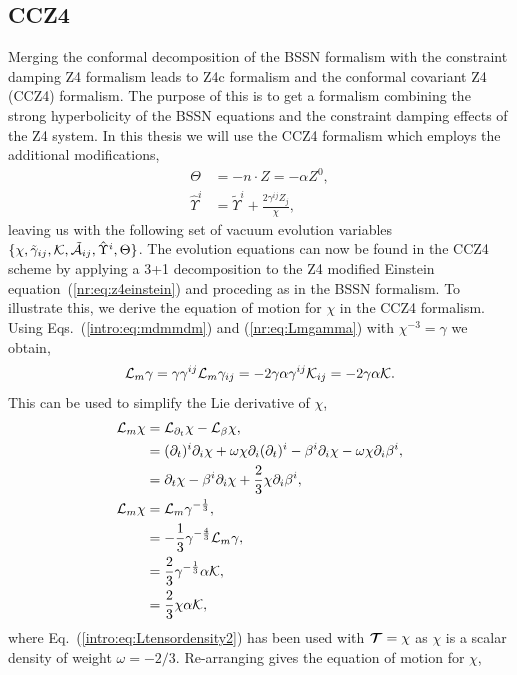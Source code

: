 \subsection{CCZ4} \label{nr:sec:ccz4}
Merging the conformal decomposition of the BSSN formalism with the constraint damping Z4 formalism leads to
Z4c formalism \cite{Bernuzzi:2009ex} and the conformal covariant Z4 (CCZ4) formalism.
The purpose of this is to get a formalism combining the strong hyperbolicity
of the BSSN equations and the constraint damping effects of the Z4 system.
In this thesis
we will use the CCZ4 formalism which employs the additional modifications,
\begin{align} \Theta &= -n\cdot Z  = -\alpha Z^0,\\
\hat{\Upsilon}^i &= \tilde{\Upsilon}^i + \frac{2\gamma^{ij}Z_j}{\chi},\end{align}
leaving us with the following set of vacuum evolution variables
$\{\chi, \tilde{\gamma}_{ij},\mathcal{K},\tilde{\mathcal{A}}_{ij},\hat{\Upsilon}^i,\Theta \}$.
The evolution equations can now
be found in the CCZ4 scheme by applying a 3+1 decomposition to the Z4 modified
Einstein equation~(\ref{nr:eq:z4einstein}) and proceding as in the BSSN formalism.
To illustrate this, we derive the equation of motion for $\chi$ in the CCZ4 formalism.
Using Eqs.~(\ref{intro:eq:mdmmdm}) and (\ref{nr:eq:Lmgamma}) with $\chi^{-3}=\gamma$
we obtain,
\begin{align}
\mathcal{L}_m {\gamma} = \gamma \gamma^{ij} \mathcal{L}_m \gamma_{ij} = -2 \gamma \alpha \gamma^{ij} \mathcal{K}_{ij} = -2\gamma \alpha \mathcal{K}.
\end{align}
This can be used to simplify the Lie derivative of $\chi$,
\begin{align}
\mathcal{L}_m \chi &= \mathcal{L}_{\partial_t}\chi - \mathcal{L}_\beta \chi,\\
 &= (\partial_t)^i \partial_i \chi + \omega \chi \partial_i (\partial_t)^i - \beta^i \partial_i \chi - \omega \chi \partial_i \beta^i ,\\
 &= \partial_t \chi - \beta^i \partial_i \chi +\frac{2}{3} \chi\partial_i \beta^i ,\\
\mathcal{L}_m \chi &= \mathcal{L}_m \gamma^{-\frac{1}{3}}  ,\\
&=-\frac{1}{3}\gamma^{-\frac{4}{3}}\mathcal{L}_m \gamma  ,\\
&=\frac{2}{3}\gamma^{-\frac{1}{3}} \alpha \mathcal{K} ,\\
&=\frac{2}{3}\chi \alpha \mathcal{K} ,
\end{align}
where Eq.~(\ref{intro:eq:Ltensordensity2}) has been used with $\boldsymbol{\mathcal{T}}=\chi$ as $\chi$ is a scalar density of weight $\omega=-2/3$. Re-arranging gives the equation of motion for $\chi$,
